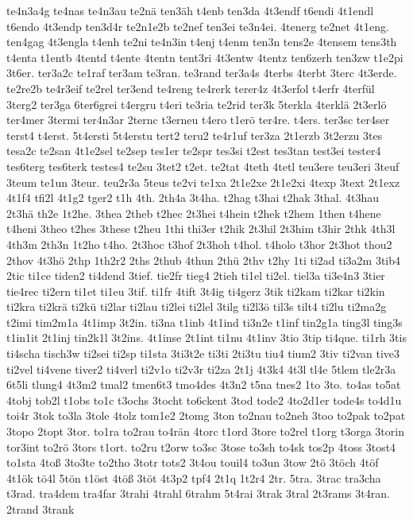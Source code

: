 {te4n3a4g
te4nas
te4n3au
te2nä
ten3äh
t4enb
ten3da
4t3endf
t6endi
4t1endl
t6endo
4t3endp
ten3d4r
te2n1e2b
te2nef
ten3ei
te3n4ei.
4tenerg
te2net
4t1eng.
ten4gag
4t3engla
t4enh
te2ni
te4n3in
t4enj
t4enm
ten3n
tens2e
4tensem
tens3th
t4enta
t1entb
4tentd
t4ente
4tentn
tent3ri
4t3entw
4tentz
ten6zerh
ten3zw
t1e2pi
3t6er.
ter3a2c
te1raf
ter3am
te3ran.
te3rand
ter3a4s
4terbs
4terbt
3terc
4t3erde.
te2re2b
te4r3eif
te2rel
ter3end
te4reng
te4rerk
terer4z
4t3erfol
t4erfr
4terfül
3terg2
ter3ga
6ter6grei
t4ergru
t4eri
te3ria
te2rid
ter3k
5terkla
4terklä
2t3erlö
ter4mer
3termi
ter4n3ar
2ternc
t3erneu
t4ero
t1erö
ter4re.
t4ers.
ter3sc
ter4ser
terst4
t4erst.
5t4ersti
5t4erstu
tert2
teru2
te4r1uf
ter3za
2t1erzb
3t2erzu
3tes
tesa2c
te2san
4t1e2sel
te2sep
tes1er
te2spr
tes3si
t2est
tes3tan
test3ei
tester4
tes6terg
tes6terk
testes4
te2su
3tet2
t2et.
te2tat
4teth
4tetl
teu3ere
teu3eri
3teuf
3teum
te1un
3teur.
teu2r3a
5teus
te2vi
te1xa
2t1e2xe
2t1e2xi
4texp
3text
2t1exz
4t1f4
tfi2l
4t1g2
tger2
t1h
4th.
2th4a
3t4ha.
t2hag
t3hai
t2hak
3thal.
4t3hau
2t3hä
th2e
1t2he.
3thea
2theb
t2hec
2t3hei
t4hein
t2hek
t2hem
1then
t4hene
t4heni
3theo
t2hes
3these
t2heu
1thi
thi3er
t2hik
2t3hil
2t3him
t3hir
2thk
4th3l
4th3m
2th3n
1t2ho
t4ho.
2t3hoc
t3hof
2t3hoh
t4hol.
t4holo
t3hor
2t3hot
thou2
2thov
4t3hö
2thp
1th2r2
2ths
2thub
4thun
2thü
2thv
t2hy
1ti
ti2ad
ti3a2m
3tib4
2tic
ti1ce
tiden2
ti4dend
3tief.
tie2fr
tieg4
2tieh
ti1el
ti2el.
tiel3a
ti3e4n3
3tier
tie4rec
ti2ern
ti1et
ti1eu
3tif.
ti1fr
4tift
3t4ig
ti4gerz
3tik
ti2kam
ti2kar
ti2kin
ti2kra
ti2krä
ti2kü
ti2lar
ti2lau
ti2lei
ti2lel
3tilg
ti2l3ö
til3s
tilt4
ti2lu
ti2ma2g
t2imi
tim2m1a
4t1imp
3t2in.
ti3na
t1inb
4t1ind
ti3n2e
t1inf
tin2g1a
ting3l
ting3s
t1in1it
2t1inj
tin2k1l
3t2ins.
4t1inse
2t1int
ti1nu
4t1inv
3tio
3tip
ti4que.
ti1rh
3tis
ti4scha
tisch3w
ti2sei
ti2sp
ti1sta
3ti3t2e
ti3ti
2ti3tu
tiu4
tium2
3tiv
ti2van
tive3
ti2vel
ti4vene
tiver2
ti4verl
ti2v1o
ti2v3r
ti2za
2t1j
4t3k4
4t3l
tl4e
5tlem
tle2r3a
6t5li
tlung4
4t3m2
tmal2
tmen6t3
tmo4des
4t3n2
t5na
tnes2
1to
3to.
to4as
to5at
4tobj
tob2l
t1obs
to1c
t3ochs
3tocht
to6ckent
3tod
tode2
4to2d1er
tode4s
to4d1u
toi4r
3tok
to3la
3tole
4tolz
tom1e2
2tomg
3ton
to2nau
to2neh
3too
to2pak
to2pat
3topo
2topt
3tor.
to1ra
to2rau
to4rän
4torc
t1ord
3tore
to2rel
t1org
t3orga
3torin
tor3int
to2rö
3tors
t1ort.
to2ru
t2orw
to3sc
3tose
to3sh
to4sk
tos2p
4toss
3tost4
to1sta
4toß
3to3te
to2tho
3totr
tots2
3t4ou
touil4
to3un
3tow
2tö
3töch
4töf
4t1ök
tö4l
5tön
t1öst
4töß
3töt
4t3p2
tpf4
2t1q
1t2r4
2tr.
5tra.
3trac
tra3cha
t3rad.
tra4dem
tra4far
3trahi
4trahl
6trahm
5t4rai
3trak
3tral
2t3rams
3t4ran.
2trand
3trank
}
